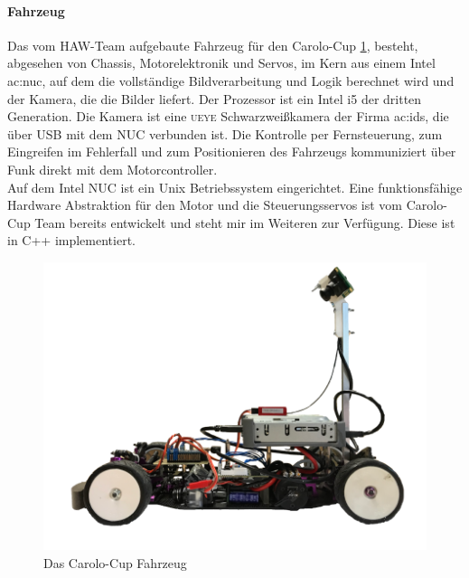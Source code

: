 \paragraph{Fahrzeug}
Das vom HAW-Team aufgebaute Fahrzeug für den Carolo-Cup \ref{img:Carolo-Fahrzeug}, besteht, abgesehen von Chassis, Motorelektronik und Servos, im Kern aus einem Intel \gls{ac:nuc}, auf dem die vollständige Bildverarbeitung und Logik berechnet wird und der Kamera, die die Bilder liefert. Der Prozessor ist ein Intel i5 der dritten Generation. Die Kamera ist eine \textsc{ueye} Schwarzweißkamera der Firma \gls{ac:ids}, die über USB mit dem NUC verbunden ist. 
Die Kontrolle per Fernsteuerung, zum Eingreifen im Fehlerfall und zum Positionieren des Fahrzeugs kommuniziert über Funk direkt mit dem Motorcontroller.\\
Auf dem Intel NUC ist ein Unix Betriebssystem eingerichtet.
Eine funktionsfähige Hardware Abstraktion für den Motor und die Steuerungsservos ist vom Carolo-Cup Team bereits entwickelt und steht mir im Weiteren zur Verfügung. Diese ist in C++ implementiert.

\begin{figure}[h]
	\centering
	\includegraphics[scale=0.3]{figures/Fahrzeug.png}
	\caption{Das Carolo-Cup Fahrzeug}
	\label{img:Carolo-Fahrzeug}
\end{figure}

